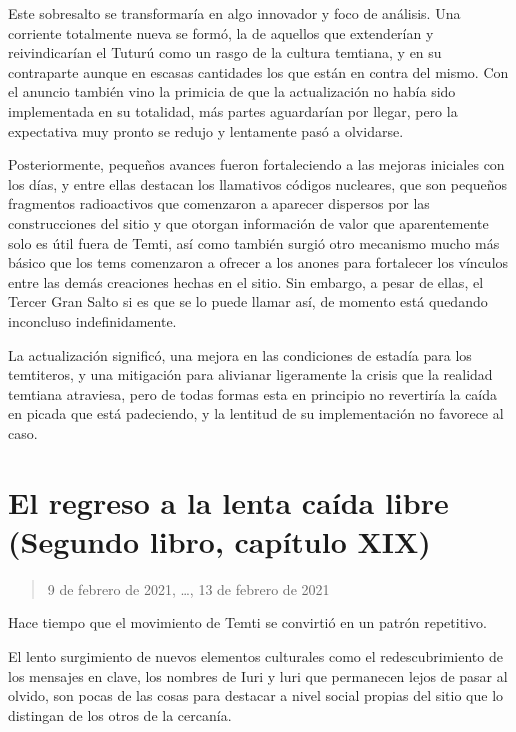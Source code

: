 \documentclass[
]{book}
\begin{document}
Este sobresalto se transformaría en algo innovador y foco de análisis. Una corriente totalmente nueva se formó, la de aquellos que extenderían y reivindicarían el Tuturú como un rasgo de la cultura temtiana, y en su contraparte aunque en escasas cantidades los que están en contra del mismo. Con el anuncio también vino la primicia de que la actualización no había sido implementada en su totalidad, más partes aguardarían por llegar, pero la expectativa muy pronto se redujo y lentamente pasó a olvidarse.

Posteriormente, pequeños avances fueron fortaleciendo a las mejoras iniciales con los días, y entre ellas destacan los llamativos códigos nucleares, que son pequeños fragmentos radioactivos que comenzaron a aparecer dispersos por las construcciones del sitio y que otorgan información de valor que aparentemente solo es útil fuera de Temti, así como también surgió otro mecanismo mucho más básico que los tems comenzaron a ofrecer a los anones para fortalecer los vínculos entre las demás creaciones hechas en el sitio. Sin embargo, a pesar de ellas, el Tercer Gran Salto si es que se lo puede llamar así, de momento está quedando inconcluso indefinidamente.

La actualización significó, una mejora en las condiciones de estadía para los temtiteros, y una mitigación para alivianar ligeramente la crisis que la realidad temtiana atraviesa, pero de todas formas esta en principio no revertiría la caída en picada que está padeciendo, y la lentitud de su implementación no favorece al caso.

\hypertarget{el-regreso-a-la-lenta-cauxedda-libre-segundo-libro-capuxedtulo-xix}{%
\section{El regreso a la lenta caída libre (Segundo libro, capítulo XIX)}\label{el-regreso-a-la-lenta-cauxedda-libre-segundo-libro-capuxedtulo-xix}}

\begin{quote}
9 de febrero de 2021, \ldots, 13 de febrero de 2021
\end{quote}

Hace tiempo que el movimiento de Temti se convirtió en un patrón repetitivo.

El lento surgimiento de nuevos elementos culturales como el redescubrimiento de los mensajes en clave, los nombres de Iuri y luri que permanecen lejos de pasar al olvido, son pocas de las cosas para destacar a nivel social propias del sitio que lo distingan de los otros de la cercanía.
\end{document}
